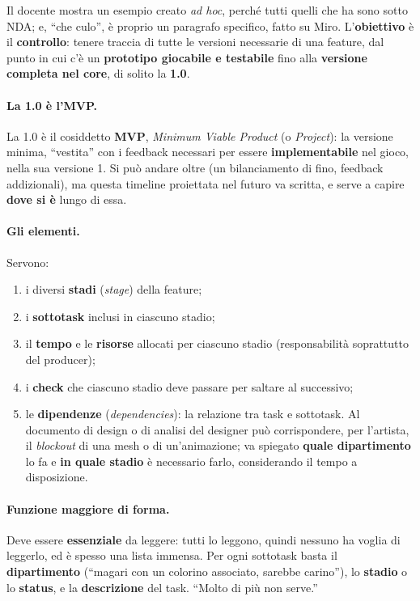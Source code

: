 Il docente mostra un esempio creato \emph{ad hoc}, perché tutti quelli che ha
sono sotto NDA; e, ``che culo'', è proprio un paragrafo specifico, fatto su
Miro. L'\textbf{obiettivo} è il \textbf{controllo}: tenere traccia di tutte
le versioni necessarie di una feature, dal punto in cui c'è un
\textbf{prototipo giocabile e testabile} fino alla \textbf{versione completa
nel core}, di solito la \textbf{1.0}.

\paragraph{La 1.0 è l'MVP.} La 1.0 è il cosiddetto \textbf{MVP},
\emph{Minimum Viable Product} (o \emph{Project}): la versione minima,
``vestita'' con i feedback necessari per essere \textbf{implementabile} nel
gioco, nella sua versione 1. Si può andare oltre (un bilanciamento di fino,
feedback addizionali), ma questa timeline proiettata nel futuro va scritta, e
serve a capire \textbf{dove si è} lungo di essa.

\paragraph{Gli elementi.} Servono:
\begin{enumerate}
  \item i diversi \textbf{stadi} (\emph{stage}) della feature;
  \item i \textbf{sottotask} inclusi in ciascuno stadio;
  \item il \textbf{tempo} e le \textbf{risorse} allocati per ciascuno stadio
        (responsabilità soprattutto del producer);
  \item i \textbf{check} che ciascuno stadio deve passare per saltare al
        successivo;
  \item le \textbf{dipendenze} (\emph{dependencies}): la relazione tra task
        e sottotask. Al documento di design o di analisi del designer può
        corrispondere, per l'artista, il \emph{blockout} di una mesh o di
        un'animazione; va spiegato \textbf{quale dipartimento} lo fa e
        \textbf{in quale stadio} è necessario farlo, considerando il tempo a
        disposizione.
\end{enumerate}

\paragraph{Funzione maggiore di forma.} Deve essere \textbf{essenziale} da
leggere: tutti lo leggono, quindi nessuno ha voglia di leggerlo, ed è spesso
una lista immensa. Per ogni sottotask basta il \textbf{dipartimento} (``magari
con un colorino associato, sarebbe carino''), lo \textbf{stadio} o lo
\textbf{status}, e la \textbf{descrizione} del task. ``Molto di più non
serve.''

